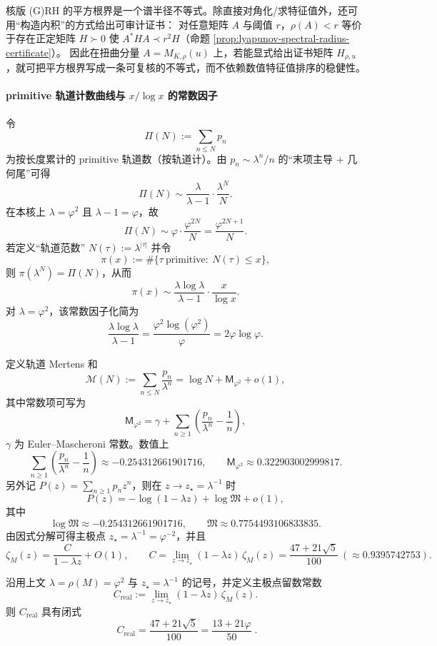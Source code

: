 \begin{remark}\label{rem:finite-rh-lyapunov}
核版 (G)RH 的平方根界是一个谱半径不等式。除直接对角化/求特征值外，还可用“构造内积”的方式给出可审计证书：
对任意矩阵 $A$ 与阈值 $r$，$\rho(A)<r$ 等价于存在正定矩阵 $H\succ 0$ 使 $A^\ast H A\prec r^2 H$（命题 \ref{prop:lyapunov-spectral-radius-certificate}）。
因此在扭曲分量 $A=M_{K,\rho}(u)$ 上，若能显式给出证书矩阵 $H_{\rho,u}$，就可把平方根界写成一条可复核的不等式，而不依赖数值特征值排序的稳健性。
\end{remark}

\paragraph{primitive 轨道计数曲线与 \texorpdfstring{$x/\log x$}{x/log x} 的常数因子}
令
\[
\Pi(N):=\sum_{n\le N}p_n
\]
为按长度累计的 primitive 轨道数（按轨道计）。由 $p_n\sim \lambda^n/n$ 的“末项主导 + 几何尾”可得
\[
\Pi(N)\sim \frac{\lambda}{\lambda-1}\cdot \frac{\lambda^N}{N}.
\]
在本核上 $\lambda=\varphi^2$ 且 $\lambda-1=\varphi$，故
\[
\Pi(N)\sim \varphi\cdot\frac{\varphi^{2N}}{N}=\frac{\varphi^{2N+1}}{N}.
\]
若定义“轨道范数” $N(\tau):=\lambda^{|\tau|}$ 并令
\[
\pi(x):=\#\{\tau\ \mathrm{primitive}:\ N(\tau)\le x\},
\]
则 $\pi(\lambda^N)=\Pi(N)$，从而
\[
\pi(x)\sim \frac{\lambda\log\lambda}{\lambda-1}\cdot \frac{x}{\log x}.
\]
对 $\lambda=\varphi^2$，该常数因子化简为
\[
\frac{\lambda\log\lambda}{\lambda-1}
=\frac{\varphi^2\log(\varphi^2)}{\varphi}
=2\varphi\log\varphi.
\]

定义轨道 Mertens 和
\[
\mathcal{M}(N):=\sum_{n\le N}\frac{p_n}{\lambda^n}
=\log N+\mathsf{M}_{\varphi^2}+o(1),
\]
其中常数项可写为
\[
\mathsf{M}_{\varphi^2}
=\gamma+\sum_{n\ge 1}\left(\frac{p_n}{\lambda^n}-\frac{1}{n}\right),
\]
$\gamma$ 为 Euler--Mascheroni 常数。数值上
\[
\sum_{n\ge 1}\left(\frac{p_n}{\lambda^n}-\frac{1}{n}\right)\approx -0.254312661901716,
\qquad
\mathsf{M}_{\varphi^2}\approx 0.322903002999817.
\]
另外记 $P(z)=\sum_{n\ge 1}p_n z^n$，则在 $z\to z_\star=\lambda^{-1}$ 时
\[
P(z)=-\log(1-\lambda z)+\log\mathfrak{M}+o(1),
\]
其中
\[
\log\mathfrak{M}\approx -0.254312661901716,\qquad
\mathfrak{M}\approx 0.7754493106833835.
\]
由因式分解可得主极点 $z_\star=\lambda^{-1}=\varphi^{-2}$，并且
\[
\zeta_M(z)=\frac{C}{1-\lambda z}+O(1),\qquad
C=\lim_{z\to z_\star}(1-\lambda z)\,\zeta_M(z)=\frac{47+21\sqrt5}{100}\ (\approx 0.9395742753).
\]

\begin{proposition}\label{prop:real-input-40-residue-constant}
沿用上文 \(\lambda=\rho(M)=\varphi^2\) 与 \(z_\star=\lambda^{-1}\) 的记号，并定义主极点留数常数
\[
C_{\mathrm{real}}:=\lim_{z\to z_\star}(1-\lambda z)\,\zeta_M(z).
\]
则 \(C_{\mathrm{real}}\) 具有闭式
\[
\boxed{\;
C_{\mathrm{real}}=\frac{47+21\sqrt5}{100}=\frac{13+21\varphi}{50}\; }.
\]
\end{proposition}

